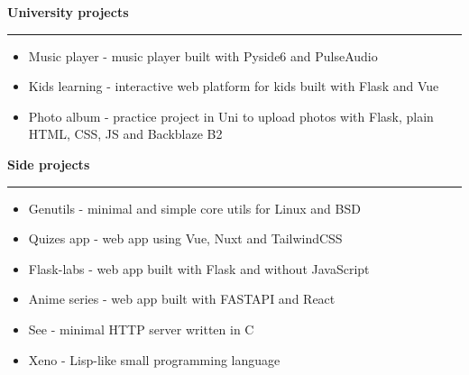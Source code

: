 {
    {\vspace{0.5cm} \hspace{-0.5cm} \Large \textbf{University projects}}
    \par\noindent\rule{\textwidth}{0.1mm}
    \begin{itemize}
        \item {Music player - music player built with Pyside6 and PulseAudio}
        \item {Kids learning - interactive web platform for kids built with Flask and Vue}
        \item {
            Photo album - practice project in Uni to upload photos with Flask, 
            plain HTML, CSS, JS and Backblaze B2
        }
    \end{itemize}

    {\vspace{0.5cm} \hspace{-1cm} \Large \textbf{Side projects}}
    \par\noindent\rule{\textwidth}{0.1mm}
    \begin{itemize}
        \item {Genutils - minimal and simple core utils for Linux and BSD}
        \item {Quizes app - web app using Vue, Nuxt and TailwindCSS}
        \item {Flask-labs - web app built with Flask and without JavaScript}
        \item {Anime series - web app built with FASTAPI and React}
        \item {See - minimal HTTP server written in C}
        \item {Xeno - Lisp-like small programming language}
    \end{itemize}
}
